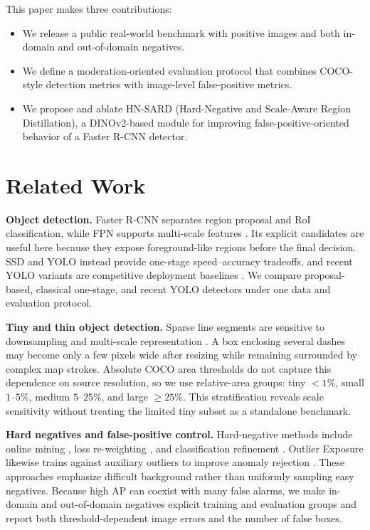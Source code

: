\documentclass[conference,a4paper]{IEEEtran}
\begin{document}
This paper makes three contributions:
\begin{itemize}
    \item We release a public real-world benchmark with positive images and both in-domain and out-of-domain negatives.
    \item We define a moderation-oriented evaluation protocol that combines COCO-style detection metrics with image-level false-positive metrics.
    \item We propose and ablate HN-SARD (Hard-Negative and Scale-Aware Region Distillation), a DINOv2-based module for improving false-positive-oriented behavior of a Faster R-CNN detector.
\end{itemize}

\section{Related Work}
\textbf{Object detection.}
Faster R-CNN \cite{ren2015faster} separates region proposal and RoI classification, while FPN supports multi-scale features \cite{lin2017fpn}. Its explicit candidates are useful here because they expose foreground-like regions before the final decision. SSD \cite{liu2016ssd} and YOLO \cite{redmon2016you} instead provide one-stage speed--accuracy tradeoffs, and recent YOLO variants are competitive deployment baselines \cite{jocher2023yolov8,wang2024yolov9,wang2024yolov10,ultralytics2024yolo11}. We compare proposal-based, classical one-stage, and recent YOLO detectors under one data and evaluation protocol.

\textbf{Tiny and thin object detection.}
Sparse line segments are sensitive to downsampling and multi-scale representation \cite{lin2017fpn,kisantal2019augmentation}. A box enclosing several dashes may become only a few pixels wide after resizing while remaining surrounded by complex map strokes. Absolute COCO area thresholds do not capture this dependence on source resolution, so we use relative-area groups: tiny $<1\%$, small $1$--$5\%$, medium $5$--$25\%$, and large $\geq25\%$. This stratification reveals scale sensitivity without treating the limited tiny subset as a standalone benchmark.

\textbf{Hard negatives and false-positive control.}
Hard-negative methods include online mining \cite{shrivastava2016ohem}, loss re-weighting \cite{lin2017focal}, and classification refinement \cite{cheng2018dcr}. Outlier Exposure likewise trains against auxiliary outliers to improve anomaly rejection \cite{hendrycks2019oe}. These approaches emphasize difficult background rather than uniformly sampling easy negatives. Because high AP can coexist with many false alarms, we make in-domain and out-of-domain negatives explicit training and evaluation groups and report both threshold-dependent image errors and the number of false boxes.
\end{document}
